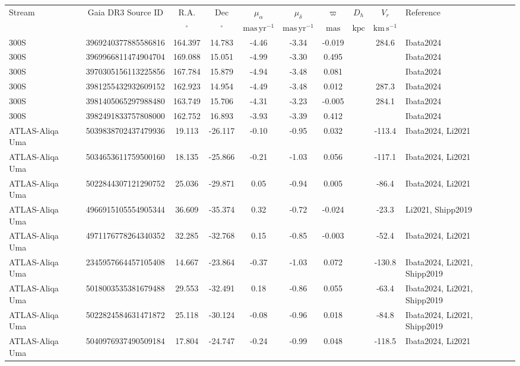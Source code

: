 \centering
\begin{tabular}{lcSSSSSSSl}
\hline\hline
Stream & Gaia DR3 Source ID & {R.A.} & {Dec} & $\mu_\alpha$ & $\mu_\delta$ & $\varpi$ & {$D_h$} & {$V_r$} & Reference \\
 &  & $\mathrm{{}^{\circ}}$ & $\mathrm{{}^{\circ}}$ & $\mathrm{mas\,yr^{-1}}$ & $\mathrm{mas\,yr^{-1}}$ & $\mathrm{mas}$ & $\mathrm{kpc}$ & $\mathrm{km\,s^{-1}}$ &  \\
\hline
300S & 3969240377885586816 & 164.397 & 14.783 & -4.46 & -3.34 & -0.019 &  & 284.6 & Ibata2024 \\
300S & 3969966811474904704 & 169.088 & 15.051 & -4.99 & -3.30 & 0.495 &  &  & Ibata2024 \\
300S & 3970305156113225856 & 167.784 & 15.879 & -4.94 & -3.48 & 0.081 &  &  & Ibata2024 \\
300S & 3981255432932609152 & 162.923 & 14.954 & -4.49 & -3.48 & 0.012 &  & 287.3 & Ibata2024 \\
300S & 3981405065297988480 & 163.749 & 15.706 & -4.31 & -3.23 & -0.005 &  & 284.1 & Ibata2024 \\
300S & 3982491833757808000 & 162.752 & 16.893 & -3.93 & -3.39 & 0.412 &  &  & Ibata2024 \\
ATLAS-Aliqa Uma & 5039838702437479936 & 19.113 & -26.117 & -0.10 & -0.95 & 0.032 &  & -113.4 & Ibata2024, Li2021 \\
ATLAS-Aliqa Uma & 5034653611759500160 & 18.135 & -25.866 & -0.21 & -1.03 & 0.056 &  & -117.1 & Ibata2024, Li2021 \\
ATLAS-Aliqa Uma & 5022844307121290752 & 25.036 & -29.871 & 0.05 & -0.94 & 0.005 &  & -86.4 & Ibata2024, Li2021 \\
ATLAS-Aliqa Uma & 4966915105554905344 & 36.609 & -35.374 & 0.32 & -0.72 & -0.024 &  & -23.3 & Li2021, Shipp2019 \\
ATLAS-Aliqa Uma & 4971176778264340352 & 32.285 & -32.768 & 0.15 & -0.85 & -0.003 &  & -52.4 & Ibata2024, Li2021 \\
ATLAS-Aliqa Uma & 2345957664457105408 & 14.667 & -23.864 & -0.37 & -1.03 & 0.072 &  & -130.8 & Ibata2024, Li2021, Shipp2019 \\
ATLAS-Aliqa Uma & 5018003535381679488 & 29.553 & -32.491 & 0.18 & -0.86 & 0.055 &  & -63.4 & Ibata2024, Li2021, Shipp2019 \\
ATLAS-Aliqa Uma & 5022824584631471872 & 25.118 & -30.124 & -0.08 & -0.96 & 0.018 &  & -84.8 & Ibata2024, Li2021, Shipp2019 \\
ATLAS-Aliqa Uma & 5040976937490509184 & 17.804 & -24.747 & -0.24 & -0.99 & 0.048 &  & -118.5 & Ibata2024, Li2021 \\

\end{tabular}

